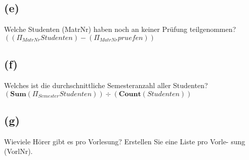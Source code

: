 \documentclass{article}
\begin{document}
\subsection{(e)}
Welche Studenten (MatrNr) haben noch an keiner Prüfung teilgenommen?\\
$((\Pi_{MatrNr} Studenten) - (\Pi_{MatrNr} pruefen))$\\

\subsection{(f)}
Welches ist die durchschnittliche Semesteranzahl aller Studenten?\\
$(\textbf{Sum}(\Pi_{Semester} Studenten)) \div  (\textbf{Count}(Studenten))$\\

\subsection{(g)}
Wieviele Hörer gibt es pro Vorlesung? Erstellen Sie eine Liste pro Vorle-
sung (VorlNr).\\
$ $
\end{document}
